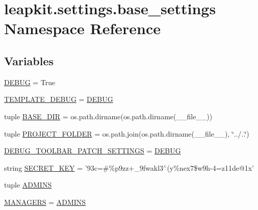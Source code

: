 \hypertarget{namespaceleapkit_1_1settings_1_1base__settings}{\section{leapkit.\-settings.\-base\-\_\-settings Namespace Reference}
\label{namespaceleapkit_1_1settings_1_1base__settings}
}
\subsection*{Variables}
\begin{DoxyCompactItemize}
\item 
\hyperlink{namespaceleapkit_1_1settings_1_1base__settings_a45b59b8d0ca3a36509b2ccbba0d7d452}{D\-E\-B\-U\-G} = True
\item 
\hyperlink{namespaceleapkit_1_1settings_1_1base__settings_a605dda137fd70377bc8299aacf600ccb}{T\-E\-M\-P\-L\-A\-T\-E\-\_\-\-D\-E\-B\-U\-G} = \hyperlink{namespaceleapkit_1_1settings_1_1base__settings_a45b59b8d0ca3a36509b2ccbba0d7d452}{D\-E\-B\-U\-G}
\item 
tuple \hyperlink{namespaceleapkit_1_1settings_1_1base__settings_a64e15b461e98fec8c760a14eea87d252}{B\-A\-S\-E\-\_\-\-D\-I\-R} = os.\-path.\-dirname(os.\-path.\-dirname(\-\_\-\-\_\-file\-\_\-\-\_\-))
\item 
tuple \hyperlink{namespaceleapkit_1_1settings_1_1base__settings_a608118bf02a6f09810f065178ee998a3}{P\-R\-O\-J\-E\-C\-T\-\_\-\-F\-O\-L\-D\-E\-R} = os.\-path.\-join(os.\-path.\-dirname(\-\_\-\-\_\-file\-\_\-\-\_\-), \char`\"{}../..\char`\"{})
\item 
\hyperlink{namespaceleapkit_1_1settings_1_1base__settings_a57cecb7a08b96c2cb4696a167ec2f347}{D\-E\-B\-U\-G\-\_\-\-T\-O\-O\-L\-B\-A\-R\-\_\-\-P\-A\-T\-C\-H\-\_\-\-S\-E\-T\-T\-I\-N\-G\-S} = \hyperlink{namespaceleapkit_1_1settings_1_1base__settings_a45b59b8d0ca3a36509b2ccbba0d7d452}{D\-E\-B\-U\-G}
\item 
string \hyperlink{namespaceleapkit_1_1settings_1_1base__settings_a98b07aa96b92ad30174e6d13569f40e9}{S\-E\-C\-R\-E\-T\-\_\-\-K\-E\-Y} = '93c=\#\%p9zz+\-\_\-9fwakl3$^\wedge$(y\%nex7\$w9h-\/4=z11de@1x'
\item 
tuple \hyperlink{namespaceleapkit_1_1settings_1_1base__settings_aae81324607aa872afbde051c2768bd47}{A\-D\-M\-I\-N\-S}
\item 
\hyperlink{namespaceleapkit_1_1settings_1_1base__settings_a542cde669476a82cd9af7c1e7b7a4b87}{M\-A\-N\-A\-G\-E\-R\-S} = \hyperlink{namespaceleapkit_1_1settings_1_1base__settings_aae81324607aa872afbde051c2768bd47}{A\-D\-M\-I\-N\-S}

\end{DoxyCompactItemize}
